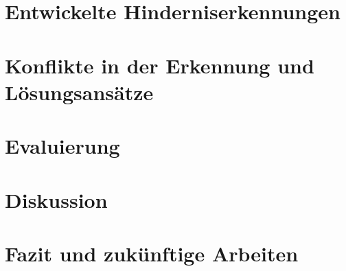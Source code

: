 \documentclass[pdftex,12pt,a4paper]{report}
\begin{document}

\chapter{Entwickelte Hinderniserkennungen}
\label{chp:developed_algorithms}



\chapter{Konflikte in der Erkennung und Lösungsansätze}
\label{chp:conflicts}



\chapter{Evaluierung}
\label{chp:evaluation}



\chapter{Diskussion}
\label{chp:discussion}



\chapter{Fazit und zukünftige Arbeiten}
\label{chp:fazit}




\appendix






    


\nocite{zureiki2008stereo}
\nocite{opencvoreilly}
\nocite{cyganek2011introduction}

\end{document}
